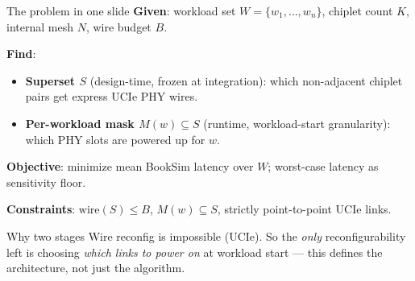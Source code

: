 \documentclass[aspectratio=169]{beamer}
\begin{document}
\begin{frame}{The problem in one slide}
\textbf{Given}: workload set $W = \{w_1, \ldots, w_n\}$, chiplet count $K$,
internal mesh $N$, wire budget $B$.

\medskip
\textbf{Find}:
\begin{itemize}
  \item \textcolor{ourblue}{\textbf{Superset $S$}} (design-time, frozen at integration):
        which non-adjacent chiplet pairs get express UCIe PHY wires.
  \item \textcolor{ourgreen}{\textbf{Per-workload mask $M(w) \subseteq S$}}
        (runtime, workload-start granularity):
        which PHY slots are powered up for $w$.
\end{itemize}

\medskip
\textbf{Objective}: minimize mean BookSim latency over $W$;
worst-case latency as sensitivity floor.

\medskip
\textbf{Constraints}: $\text{wire}(S) \le B$, $M(w) \subseteq S$,
strictly point-to-point UCIe links.

\medskip
\begin{alertblock}{Why two stages}
Wire reconfig is impossible (UCIe). So the \emph{only} reconfigurability
left is choosing \emph{which links to power on} at workload start
--- this defines the architecture, not just the algorithm.
\end{alertblock}
\end{frame}
\end{document}
